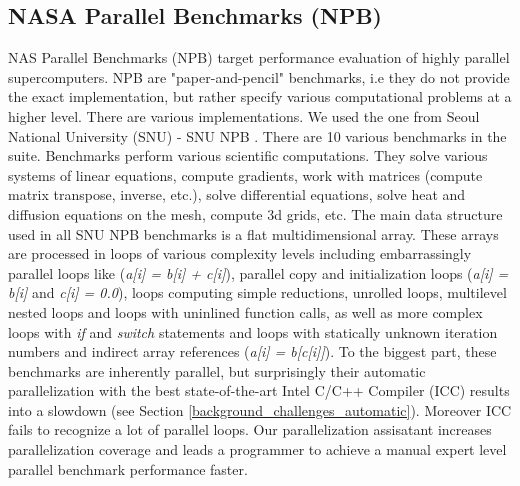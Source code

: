 \subsection{NASA Parallel Benchmarks (NPB)}
\label{background_benchmarks_npb}
\quad NAS Parallel Benchmarks (NPB) \cite{nasa-parallel-benchmarks} target performance evaluation of highly parallel supercomputers. NPB are "paper-and-pencil" benchmarks, i.e they do not provide the exact implementation, but rather specify various computational problems at a higher level. There are various implementations. We used the one from Seoul National University (SNU) - SNU NPB \cite{snu-npb-benchmarks}.\newline\null
\quad There are 10 various benchmarks in the suite. Benchmarks perform various scientific computations. They solve various systems of linear equations, compute gradients, work with matrices (compute matrix transpose, inverse, etc.), solve differential equations, solve heat and diffusion equations on the mesh, compute 3d grids, etc. The main data structure used in all SNU NPB benchmarks is a flat multidimensional array. These arrays are processed in loops of various complexity levels including embarrassingly parallel loops like (\textit{a[i] = b[i] + c[i]}), parallel copy and initialization loops (\textit{a[i] = b[i]} and \textit{c[i] = 0.0}), loops computing simple reductions, unrolled loops, multilevel nested loops and loops with uninlined function calls, as well as more complex loops with \textit{if} and \textit{switch} statements and loops with statically unknown iteration numbers and indirect array references (\textit{a[i] = b[c[i]]}).\newline\null
\quad To the biggest part, these benchmarks are inherently parallel, but surprisingly their automatic parallelization with the best state-of-the-art Intel C/C++ Compiler (ICC) \cite{icc-compiler} results into a slowdown (see Section \ref{background_challenges_automatic}). Moreover ICC fails to recognize a lot of parallel loops. Our parallelization assisatant increases parallelization coverage and leads a programmer to achieve a manual expert level parallel benchmark performance faster. 
